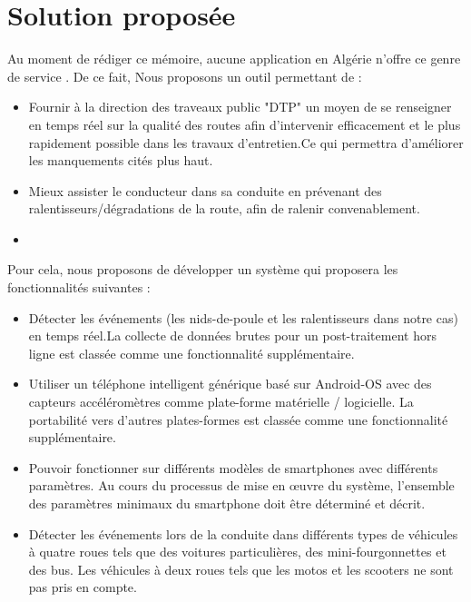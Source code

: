 \section{Solution proposée}
Au moment de rédiger ce mémoire, aucune application en Algérie n’offre ce genre de service .
De ce fait, Nous proposons un outil permettant de :
\begin{itemize}
	\item Fournir à la direction des traveaux public "DTP" un moyen de se renseigner en temps réel sur la qualité des routes afin d'intervenir efficacement et le plus rapidement possible dans les travaux d'entretien.Ce qui permettra d’améliorer les manquements cités plus haut.
  \item Mieux assister le conducteur dans sa conduite en prévenant des ralentisseurs/dégradations de la route, afin de ralenir convenablement. \newline
  \item 
\end{itemize}
Pour cela, nous proposons de développer un système qui proposera les fonctionnalités suivantes :
\begin{itemize}
  \item Détecter les événements (les nids-de-poule et les ralentisseurs dans notre cas) en temps réel.La collecte de données brutes pour un post-traitement hors ligne est classée comme une fonctionnalité supplémentaire. 
  \item Utiliser un téléphone intelligent générique basé sur Android-OS avec des capteurs accéléromètres comme plate-forme matérielle / logicielle. La portabilité vers d'autres plates-formes est classée comme une fonctionnalité supplémentaire.
  \item Pouvoir fonctionner sur différents modèles de smartphones avec différents paramètres. Au cours du processus de mise en œuvre du système, l'ensemble des paramètres minimaux du smartphone doit être déterminé et décrit.
  \item Détecter les événements lors de la conduite dans différents types de véhicules à quatre roues tels que des voitures particulières, des mini-fourgonnettes et des bus. Les véhicules à deux roues tels que les motos et les scooters ne sont pas pris en compte.
\end{itemize}

\renewcommand {\thesection}{\thechapter.\arabic{section}}













